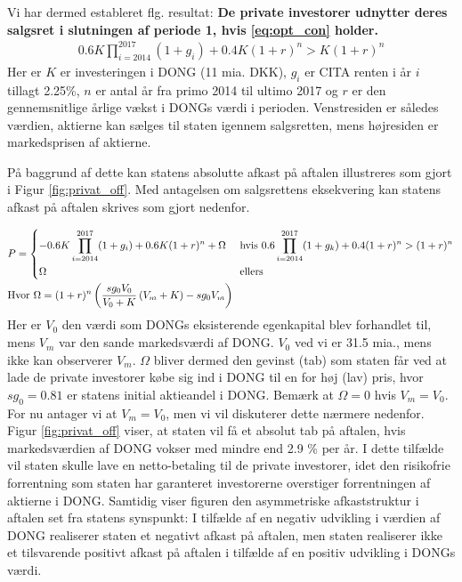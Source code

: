 \documentclass{article}
\begin{document}






Vi har dermed estableret flg. resultat: \textbf{De private investorer udnytter deres salgsret i slutningen af periode 1, hvis \eqref{eq:opt_con} holder. } 
\begin{align}
0.6K\prod_{i=2014}^{2017}(1+g_i)+0.4K(1+r)^n>K(1+r)^n \label{eq:opt_con}
\end{align}
Her er $K$ er investeringen i DONG (11 mia. DKK), $g_i$ er CITA renten i år $i$ tillagt 2.25\%, $n$ er antal år fra primo 2014 til ultimo 2017 og $r$ er den gennemsnitlige årlige vækst i DONGs værdi i perioden. Venstresiden er således værdien, aktierne kan sælges til staten igennem salgsretten, mens højresiden er markedsprisen af aktierne.

På baggrund af dette kan statens absolutte afkast på aftalen illustreres som gjort i Figur \ref{fig:privat_off}. Med antagelsen om salgsrettens eksekvering kan statens afkast på aftalen skrives som gjort nedenfor. %

\begin{align}
&P= 
\begin{dcases} 
-0.6K \prod_{i=2014}^{2017} (1+g_i)+0.6K(1+r)^n +\Omega&\text{     hvis    } 0.6\prod_{i=2014}^{2017}(1+g_k)+0.4(1+r)^n>(1+r)^n \\ 
\Omega  &\text{   ellers }
\end {dcases} \\
&\text{Hvor } \Omega=(1+r)^n\left( \frac{sg_0 V_0}{V_0+K} \left( V_m+K \right)-sg_0 V_m \right)
\label{eq:Goldman_deal}
\end{align}
Her er $V_0$ den værdi som DONGs eksisterende egenkapital blev forhandlet til, mens $V_m$ var den sande markedsværdi af DONG. $V_0$ ved vi er 31.5 mia., mens ikke kan observerer $V_m$. $\Omega$ bliver dermed den gevinst (tab) som staten får ved at lade de private investorer købe sig ind i DONG til en for høj (lav) pris, hvor $sg_0=0.81$ er statens initial aktieandel i DONG. Bemærk at $\Omega=0$ hvis $V_m=V_0$. For nu antager vi at $V_m=V_0$, men vi vil diskuterer dette nærmere nedenfor. Figur \ref{fig:privat_off} viser, at staten vil få et absolut tab på aftalen, hvis markedsværdien af DONG vokser med mindre end 2.9 \% per år. I dette tilfælde vil staten skulle lave en netto-betaling til de private investorer, idet den risikofrie forrentning som staten har garanteret investorerne overstiger forrentningen af aktierne i DONG. Samtidig viser figuren den asymmetriske afkaststruktur i aftalen set fra statens synspunkt: I tilfælde af en negativ udvikling i værdien af DONG realiserer staten et negativt afkast på aftalen, men staten realiserer ikke et tilsvarende positivt afkast på aftalen i tilfælde af en positiv udvikling i DONGs værdi. 
\end{document}
